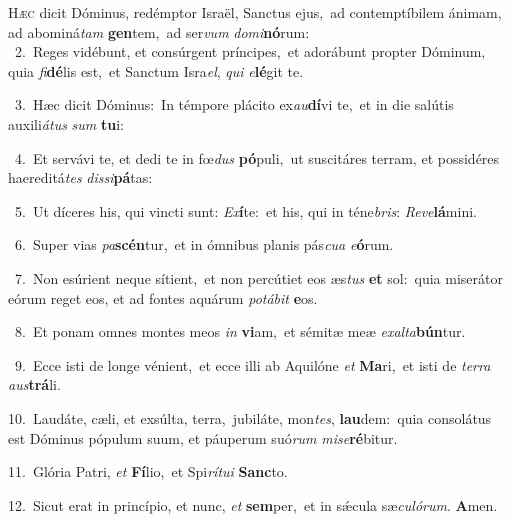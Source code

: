 \lettrine{\initial\textcolor{\initialcolor}{H}}{æc} dicit Dóminus, redémptor Israël, Sanctus ejus,~\dagger ad contemptíbilem ánimam, ad abominá\textit{tam} \textbf{gen}\-tem,~\star ad ser\textit{vum} \textit{do}\-\textit{mi}\textbf{nó}rum:\\
{\numbfont\textcolor{\numbcolor}{~2.}}~Reges vidébunt, et consúrgent príncipes,~\dagger et adorábunt propter Dóminum, quia \textit{fi}\-\textbf{dé}lis est,~\star et Sanctum Isra\-\textit{el}\-, \textit{qui} \textit{e}\-\textbf{lé}git te.\par
{\numbfont\textcolor{\numbcolor}{~3.}}~Hæc dicit Dóminus:~\dagger In témpore plácito ex\-\textit{au}\-\textbf{dí}vi te,~\star et in die salútis auxili\-\textit{á}\-\textit{tus} \textit{sum} \textbf{tu}\-i:\par
{\numbfont\textcolor{\numbcolor}{~4.}}~Et servávi te, et dedi te in fœ\textit{dus} \textbf{pó}\-puli,~\star ut suscitáres terram, et possidéres haereditá\textit{tes} \textit{dis}\-\textit{si}\textbf{pá}tas:\par
{\numbfont\textcolor{\numbcolor}{~5.}}~Ut díceres his, qui vincti sunt: \textit{Ex}\-\textbf{í}te:~\star et his, qui in téne\-\textit{bris}\-: \textit{Re}\-\textit{ve}\textbf{lá}mini.\par
{\numbfont\textcolor{\numbcolor}{~6.}}~Super vias \textit{pa}\-\textbf{scén}tur,~\star et in ómnibus planis pás\-\textit{cu}\-\textit{a} \textit{e}\-\textbf{ó}rum.\par
{\numbfont\textcolor{\numbcolor}{~7.}}~Non esúrient neque sítient,~\dagger et non percútiet eos æs\textit{tus} \textbf{et} sol:~\star quia miserátor eórum reget eos, et ad fontes aquárum \textit{po}\-\textit{tá}\textit{bit} \textbf{e}\-os.\par
{\numbfont\textcolor{\numbcolor}{~8.}}~Et ponam omnes montes meos \textit{in} \textbf{vi}\-am,~\star et sémitæ meæ \textit{ex}\-\textit{al}\textit{ta}\textbf{bún}tur.\par
{\numbfont\textcolor{\numbcolor}{~9.}}~Ecce isti de longe vénient,~\dagger et ecce illi ab Aquilóne \textit{et} \textbf{Ma}\-ri,~\star et isti de \textit{ter}\-\textit{ra} \textit{aus}\-\textbf{trá}li.\par
{\numbfont\textcolor{\numbcolor}{10.}}~Laudáte, cæli, et exsúlta, terra,~\dagger jubiláte, mon\-\textit{tes}\-, \textbf{lau}\-dem:~\star quia consolátus est Dóminus pópulum suum, et páuperum suó\textit{rum} \textit{mi}\-\textit{se}\textbf{ré}bitur.\par
{\numbfont\textcolor{\numbcolor}{11.}}~Glória Patri, \textit{et} \textbf{Fí}\-lio,~\star et Spi\-\textit{rí}\-\textit{tu}\textit{i} \textbf{Sanc}\-to.\par
{\numbfont\textcolor{\numbcolor}{12.}}~Sicut erat in princípio, et nunc, \textit{et} \textbf{sem}\-per,~\star et in sǽcula sæ\-\textit{cu}\-\textit{ló}\textit{rum}. \textbf{A}\-men.\par
